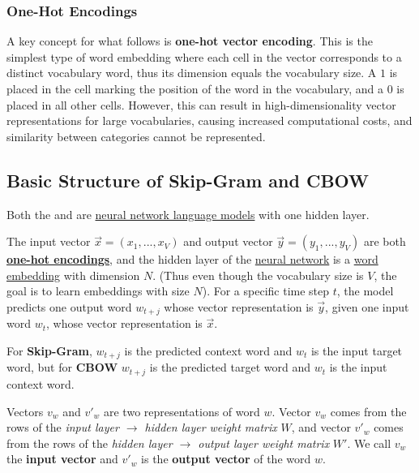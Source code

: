 \subsubsection{One-Hot Encodings} \label{sec:OneHotEncodings}

A key concept for what follows is \textbf{one-hot vector encoding}. This is the simplest type of word embedding where each cell in the vector corresponds to a distinct vocabulary word, thus its dimension equals the vocabulary size. A $1$ is placed in the cell marking the position of the word in the vocabulary, and a $0$ is placed in all other cells. However, this can result in high-dimensionality vector representations for large vocabularies, causing increased computational costs, and similarity between categories cannot be represented. 

\subsection{Basic Structure of Skip-Gram and CBOW} \label{sec:BasicSkipGramAndCBOW}

Both the  and  are \hyperref[sec:NeuralLM]{neural network language models} with one hidden layer. \newline

The input vector $\overrightarrow{x} = (x_1,..., x_V)$ and output vector $\overrightarrow{y} = (y_1,...,y_V)$ are both \textbf{\hyperref[sec:OneHotEncodings]{one-hot encodings}}, and the hidden layer of the \hyperref[sec:NeuralLM]{neural network} is a \hyperref[sec:WordEmbeddings]{word embedding} with dimension $N$. (Thus even though the vocabulary size is $V$, the goal is to learn embeddings with size $N$). For a specific time step $t$, the model predicts one output word $w_{t+j}$ whose vector representation is $\overrightarrow{y}$, given one input word $w_t$, whose vector representation is $\overrightarrow{x}$. \newline 

For \textbf{Skip-Gram}, $w_{t+j}$ is the predicted context word and $w_t$ is the input target word, but for \textbf{CBOW} $w_{t+j}$ is the predicted target word and $w_t$ is the input context word. \newline 

Vectors $v_w$ and $v'_w$ are two representations of word $w$. Vector $v_w$ comes from the rows of the \textit{input layer $\rightarrow$ hidden layer weight matrix} $W$, and vector $v'_w$ comes from the rows of the \textit{hidden layer $\rightarrow$ output layer weight matrix} $W'$. We call $v_w$ the \textbf{input vector} and $v'_w$ is the \textbf{output vector} of the word $w$. 



